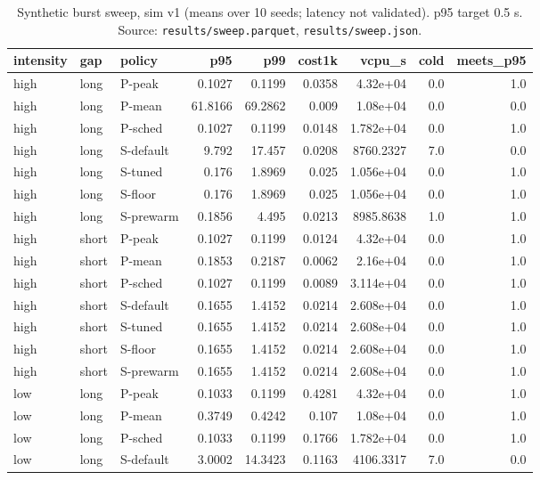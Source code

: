 \begin{table}[htbp]
\centering
\tiny\renewcommand{\arraystretch}{0.85}
\caption{Synthetic burst sweep, sim v1 (means over 10 seeds; latency not validated). p95 target 0.5 s. Source: \texttt{results/sweep.parquet}, \texttt{results/sweep.json}.}
\label{tab:sweepv1}
\setlength{\tabcolsep}{3pt}
\begin{tabular}{lllrrrrrr}
\toprule
\textbf{intensity} & \textbf{gap} & \textbf{policy} & \textbf{p95} & \textbf{p99} & \textbf{cost1k} & \textbf{vcpu\_s} & \textbf{cold} & \textbf{meets\_p95} \\
\midrule
high & long & P-peak & 0.1027 & 0.1199 & 0.0358 & 4.32e+04 & 0.0 & 1.0 \\
high & long & P-mean & 61.8166 & 69.2862 & 0.009 & 1.08e+04 & 0.0 & 0.0 \\
high & long & P-sched & 0.1027 & 0.1199 & 0.0148 & 1.782e+04 & 0.0 & 1.0 \\
high & long & S-default & 9.792 & 17.457 & 0.0208 & 8760.2327 & 7.0 & 0.0 \\
high & long & S-tuned & 0.176 & 1.8969 & 0.025 & 1.056e+04 & 0.0 & 1.0 \\
high & long & S-floor & 0.176 & 1.8969 & 0.025 & 1.056e+04 & 0.0 & 1.0 \\
high & long & S-prewarm & 0.1856 & 4.495 & 0.0213 & 8985.8638 & 1.0 & 1.0 \\
high & short & P-peak & 0.1027 & 0.1199 & 0.0124 & 4.32e+04 & 0.0 & 1.0 \\
high & short & P-mean & 0.1853 & 0.2187 & 0.0062 & 2.16e+04 & 0.0 & 1.0 \\
high & short & P-sched & 0.1027 & 0.1199 & 0.0089 & 3.114e+04 & 0.0 & 1.0 \\
high & short & S-default & 0.1655 & 1.4152 & 0.0214 & 2.608e+04 & 0.0 & 1.0 \\
high & short & S-tuned & 0.1655 & 1.4152 & 0.0214 & 2.608e+04 & 0.0 & 1.0 \\
high & short & S-floor & 0.1655 & 1.4152 & 0.0214 & 2.608e+04 & 0.0 & 1.0 \\
high & short & S-prewarm & 0.1655 & 1.4152 & 0.0214 & 2.608e+04 & 0.0 & 1.0 \\
low & long & P-peak & 0.1033 & 0.1199 & 0.4281 & 4.32e+04 & 0.0 & 1.0 \\
low & long & P-mean & 0.3749 & 0.4242 & 0.107 & 1.08e+04 & 0.0 & 1.0 \\
low & long & P-sched & 0.1033 & 0.1199 & 0.1766 & 1.782e+04 & 0.0 & 1.0 \\
low & long & S-default & 3.0002 & 14.3423 & 0.1163 & 4106.3317 & 7.0 & 0.0 \\

\end{tabular}
\end{table}
